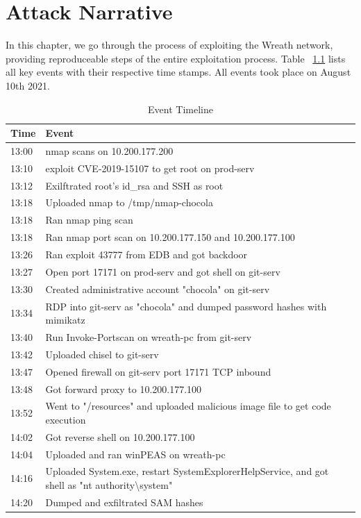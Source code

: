 \chapter{Attack Narrative}
In this chapter, we go through the process of exploiting the Wreath network, providing reproduceable steps of the entire exploitation process. Table ~\ref{tbl:event timeline} lists all key events with their respective time stamps. All events took place on August 10th 2021.

\begin{table}[h]
  \centering
  \begin{tabular}{|l|p{15cm}|}
    \hline
    Time & Event \\
    \hline
    13:00 & nmap scans on 10.200.177.200 \\
    \hline
    13:10 & exploit CVE-2019-15107 to get root on prod-serv \\
    \hline
    13:12 & Exilftrated root's id\_rsa and SSH as root \\
    \hline
    13:18 & Uploaded nmap to /tmp/nmap-chocola \\
    \hline
    13:18 & Ran nmap ping scan \\
    \hline
    13:18 & Ran nmap port scan on 10.200.177.150 and 10.200.177.100 \\
    \hline
    13:26 & Ran exploit 43777 from EDB and got backdoor \\
    \hline
    13:27 & Open port 17171 on prod-serv and got shell on git-serv \\
    \hline
    13:30 & Created administrative account "chocola" on git-serv \\
    \hline
    13:34 & RDP into git-serv as "chocola" and dumped password hashes with mimikatz \\
    \hline
    13:40 & Run Invoke-Portscan on wreath-pc from git-serv \\
    \hline
    13:42 & Uploaded chisel to git-serv \\
    \hline
    13:47 & Opened firewall on git-serv port 17171 TCP inbound \\
    \hline
    13:48 & Got forward proxy to 10.200.177.100 \\
    \hline
    13:52 & Went to "/resources" and uploaded malicious image file to get code execution \\
    \hline
    14:02 & Got reverse shell on 10.200.177.100 \\
    \hline
    14:04 & Uploaded and ran winPEAS on wreath-pc \\
    \hline
    14:16 & Uploaded System.exe, restart SystemExplorerHelpService, and got shell as "nt authority\textbackslash system" \\
    \hline
    14:20 & Dumped and exfiltrated SAM hashes \\
    \hline
  \end{tabular}
\caption{Event Timeline}
\label{tbl:event timeline}
\end{table}

